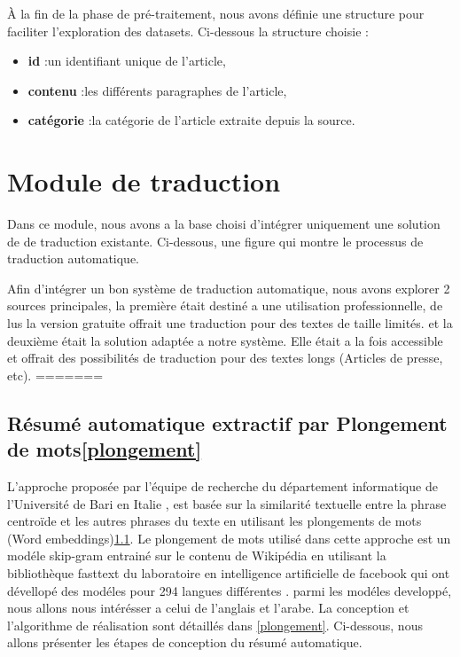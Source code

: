             À la fin de la phase de pré-traitement, nous avons définie une structure pour faciliter l'exploration des datasets. Ci-dessous la structure choisie :
            \begin{itemize}
                \item{\textbf{id} :}un identifiant unique de l'article,
                \item{\textbf{contenu} :}les différents paragraphes de l'article,
                \item{\textbf{catégorie} :}la catégorie de l'article extraite depuis la source.
            \end{itemize}


























\section{Module de traduction}

Dans ce module, nous avons a la base choisi d'intégrer uniquement une solution de de traduction existante. Ci-dessous, une figure qui montre le processus de traduction automatique.




Afin d'intégrer un bon système de traduction automatique, nous avons explorer 2 sources principales, la première était destiné a une utilisation professionnelle, de lus la version gratuite offrait une traduction pour des textes de taille limités. et la deuxième était la solution adaptée a notre système. Elle était a la fois accessible et offrait des possibilités de traduction pour des textes longs (Articles de presse, etc). 
=======
    \subsection{Résumé automatique extractif par Plongement de mots\ref{plongement}}
    L'approche proposée par l'équipe de recherche du département informatique de l'Université de Bari en Italie \cite{bari}, est basée sur la similarité textuelle entre la phrase centroïde et les autres phrases du texte en utilisant les plongements de mots (Word embeddings)\ref{}. Le plongement de mots utilisé dans cette approche est un modéle skip-gram entrainé sur le contenu de Wikipédia \cite{} en utilisant la bibliothèque fasttext du laboratoire en intelligence artificielle de facebook qui ont dévellopé des modéles pour 294 langues différentes \cite{fasttext}. parmi les modéles developpé, nous allons nous intérésser a celui de l'anglais et l'arabe. La conception et l'algorithme de réalisation sont détaillés dans \ref{plongement}. Ci-dessous, nous allons présenter les étapes de conception du résumé automatique.


